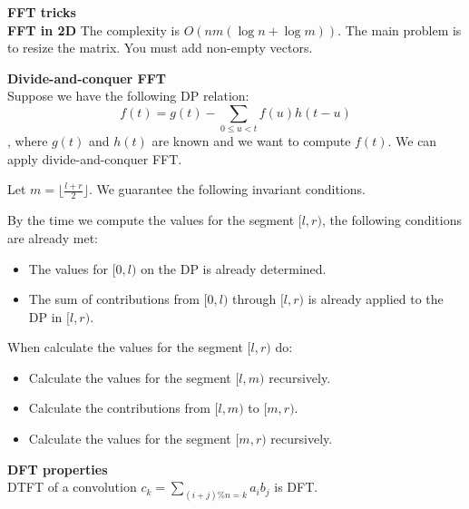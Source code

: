 \textbf{\huge{FFT tricks}}\\
\textbf{FFT in 2D}
The complexity is $O(nm(\log n + \log m))$.
The main problem is to resize the matrix. You must add non-empty vectors.

\textbf{Divide-and-conquer FFT}\\
Suppose we have the following DP relation: $$f(t) = g(t) - \sum_{0 \le u < t} f(u) h(t-u)$$,
where $g(t)$ and $h(t)$ are known and we want to compute $f(t)$. We can apply divide-and-conquer FFT.

Let $m = \lfloor\frac{l+r}{2}\rfloor$. We guarantee the following invariant conditions.

By the time we compute the values for the segment $[l,r)$, the following conditions are already met:
\begin{itemize}
\item The values for $[0,l)$ on the DP is already determined.
\item The sum of contributions from $[0,l)$ through $[l,r)$ is already applied to the DP in $[l,r)$.
\end{itemize}

When calculate the values for the segment $[l, r)$ do:
\begin{itemize}
\item Calculate the values for the segment $[l,m)$ recursively.
\item Calculate the contributions from $[l,m)$ to $[m,r)$.
\item Calculate the values for the segment $[m,r)$ recursively.
\end{itemize}

\textbf{DFT properties}\\
DTFT of a convolution $c_k = \sum_{(i + j)\%n=k}a_ib_j$ is DFT.
